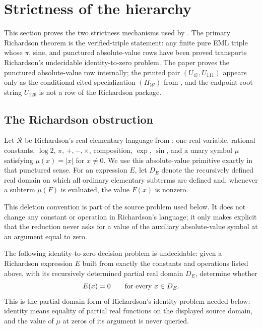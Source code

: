 \section{Strictness of the hierarchy}\label{sec:strictness}

This section proves the two strictness mechanisms used by
.  The primary Richardson theorem is the verified-triple
statement: any finite pure EML triple whose \(\pi\), sine, and punctured
absolute-value rows have been proved transports Richardson's undecidable
identity-to-zero problem.  The paper proves the punctured absolute-value row
internally; the printed pair \((U_{47},U_{111})\) appears only as the conditional
cited specialization \((H_{\mathcal W})\) from , and the
endpoint-root string \(U_{126}\) is not a row of the Richardson package.

\subsection{The Richardson obstruction}

Let \(\mathcal R\) be Richardson's real elementary language from
\cite[pp.~514, 520, Theorem~2]{Richardson1968}: one real variable, rational
constants, \(\log2\), \(\pi\), \(+,-,\times\), composition, \(\exp\), \(\sin\),
and a unary symbol \(\mu\) satisfying \(\mu(x)=|x|\) for \(x\ne0\).  We use this
absolute-value primitive exactly in that punctured sense.  For an expression
\(E\), let \(D_E\) denote the recursively defined real domain on which all
ordinary elementary subterms are defined and, whenever a subterm \(\mu(F)\) is
evaluated, the value \(F(x)\) is nonzero.

This deletion convention is part of the source problem used below.  It does not
change any constant or operation in Richardson's language; it only makes explicit
that the reduction never asks for a value of the auxiliary absolute-value symbol
at an argument equal to zero.

\begin{theorem}
\label{thm:richardson-punctured-source-problem}
\label{lem:richardson-punctured-mu-reduction}
\label{lem:richardson-fragment}
The following identity-to-zero decision problem is undecidable: given a
Richardson expression \(E\) built from exactly the constants and operations listed
above, with its recursively determined partial real domain \(D_E\), determine
whether
\[
  E(x)=0\qquad\hbox{for every }x\in D_E .
\]
This is the partial-domain form of Richardson's identity problem needed below:
identity means equality of partial real functions on the displayed source domain,
and the value of \(\mu\) at zeros of its argument is never queried.
\end{theorem}

